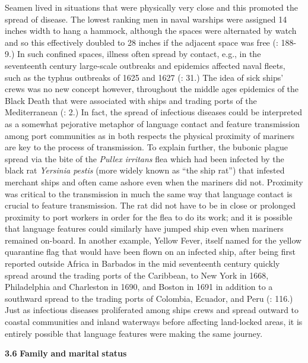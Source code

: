 Seamen lived in situations that were physically very close and this promoted the spread of disease. The lowest ranking men in naval warships were assigned 14 inches width to hang a hammock, although the spaces were alternated by watch and so this effectively doubled to 28 inches if the adjacent space was free (\citealt{AdkinsAdkins2008}: 188-9.) In such confined spaces, illness often spread by contact, e.g., in the seventeenth century large-scale outbreaks and epidemics affected naval fleets, such as the typhus outbreaks of 1625 and 1627 (\citealt{Brown2011}: 31.) The idea of sick ships’ crews was no new concept however, throughout the middle ages epidemics of the Black Death that were associated with ships and trading ports of the Mediterranean (\citealt{Brown2011}: 2.) In fact, the spread of infectious diseases could be interpreted as a somewhat pejorative metaphor of language contact and feature transmission among port communities as in both respects the physical proximity of mariners are key to the process of transmission. To explain further, the bubonic plague spread via the bite of the \textit{Pullex irritans} flea which had been infected by the black rat \textit{Yersinia pestis} (more widely known as “the ship rat”) that infested merchant ships and often came ashore even when the mariners did not. Proximity was critical to the transmission in much the same way that language contact is crucial to feature transmission. The rat did not have to be in close or prolonged proximity to port workers in order for the flea to do its work; and it is possible that language features could similarly have jumped ship even when mariners remained on-board. In another example, Yellow Fever, itself named for the yellow quarantine flag that would have been flown on an infected ship, after being first reported outside Africa in Barbados in the mid seventeenth century quickly spread around the trading ports of the Caribbean, to New York in 1668, Philadelphia and Charleston in 1690, and Boston in 1691 in addition to a southward spread to the trading ports of Colombia, Ecuador, and Peru (\citealt{Brown2011}: 116.) Just as infectious diseases proliferated among ships crews and spread outward to coastal communities and inland waterways before affecting land-locked areas, it is entirely possible that language features were making the same journey. 

\textbf{3.6} \textbf{Family} \textbf{and} \textbf{marital} \textbf{status}

